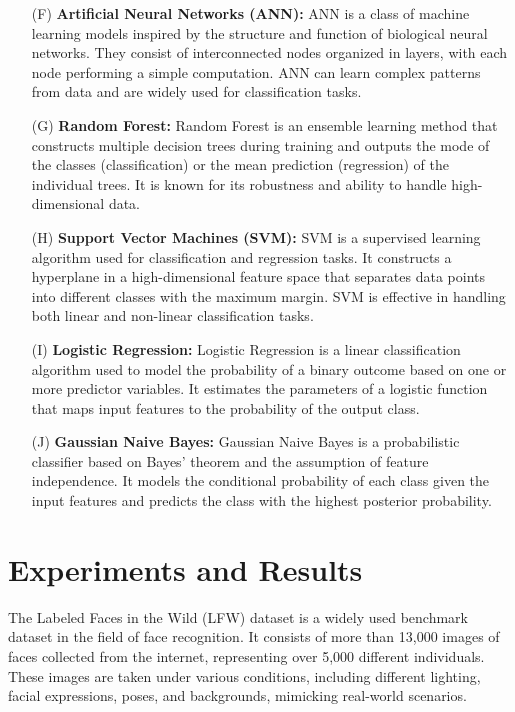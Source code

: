 \documentclass[a4paper]{article}
\theoremstyle{plain}
\theoremstyle{definition}
\begin{document}
\begin{enumerate}
\item[(F)] \textbf{Artificial Neural Networks (ANN):}
ANN is a class of machine learning models inspired by the structure and function of biological neural networks. They consist of interconnected nodes organized in layers, with each node performing a simple computation. ANN can learn complex patterns from data and are widely used for classification tasks.
\item[(G)] \textbf{Random Forest:}
Random Forest is an ensemble learning method that constructs multiple decision trees during training and outputs the mode of the classes (classification) or the mean prediction (regression) of the individual trees. It is known for its robustness and ability to handle high-dimensional data.
\item[(H)] \textbf{Support Vector Machines (SVM):}
SVM is a supervised learning algorithm used for classification and regression tasks. It constructs a hyperplane in a high-dimensional feature space that separates data points into different classes with the maximum margin. SVM is effective in handling both linear and non-linear classification tasks.
\item[(I)] \textbf{Logistic Regression:}
Logistic Regression is a linear classification algorithm used to model the probability of a binary outcome based on one or more predictor variables. It estimates the parameters of a logistic function that maps input features to the probability of the output class.
\item[(J)] \textbf{Gaussian Naive Bayes:}
Gaussian Naive Bayes is a probabilistic classifier based on Bayes' theorem and the assumption of feature independence. It models the conditional probability of each class given the input features and predicts the class with the highest posterior probability.
 \end{enumerate}
	\newpage

	
	\section{Experiments and Results}
	\label{sec:app}
	The Labeled Faces in the Wild (LFW) dataset is a widely used benchmark dataset in the field of face recognition. It consists of more than 13,000 images of faces collected from the internet, representing over 5,000 different individuals. These images are taken under various conditions, including different lighting, facial expressions, poses, and backgrounds, mimicking real-world scenarios.\vspace{8pt}
\end{document}
